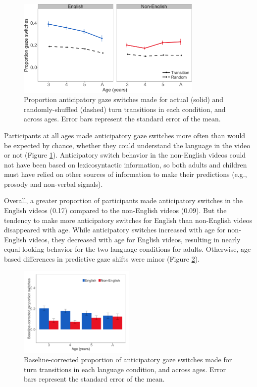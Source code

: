 \documentclass[authoryear, 12pt]{elsarticle}
\begin{document}
\begin{figure}[t]
\begin{center}
\includegraphics[width=0.8\textwidth]{figures/FIG-randvsreal-FL.png}
\end{center}
\caption{Proportion anticipatory gaze switches made for actual (solid) and randomly-shuffled (dashed) turn transitions in each condition, and across ages. Error bars represent the standard error of the mean.} 
\label{fig:randvsrealFL}
\end{figure}

Participants at all ages made anticipatory gaze switches more often than would be expected by chance, whether they could understand the language in the video or not (Figure \ref{fig:randvsrealFL}). Anticipatory switch behavior in the non-English videos could not have been based on lexicosyntactic information, so both adults and children must have relied on other sources of information to make their predictions (e.g., prosody and non-verbal signals).

Overall, a greater proportion of participants made anticipatory switches in the English videos (0.17) compared to the non-English videos (0.09). But the tendency to make more anticipatory switches for English than non-English videos disappeared with age. While anticipatory switches increased with age for non-English videos, they decreased with age for English videos, resulting in nearly equal looking behavior for the two language conditions for adults. Otherwise, age-based differences in predictive gaze shifts were minor (Figure \ref{fig:conditionsFL}).

\begin{figure}[t]
\begin{center}
\includegraphics[width=0.5\textwidth]{figures/FIG-conditions-FL.png}
\end{center}
\caption{Baseline-corrected proportion of anticipatory gaze switches made for turn transitions in each language condition, and across ages. Error bars represent the standard error of the mean.} 
\label{fig:conditionsFL}
\end{figure}
\end{document}
